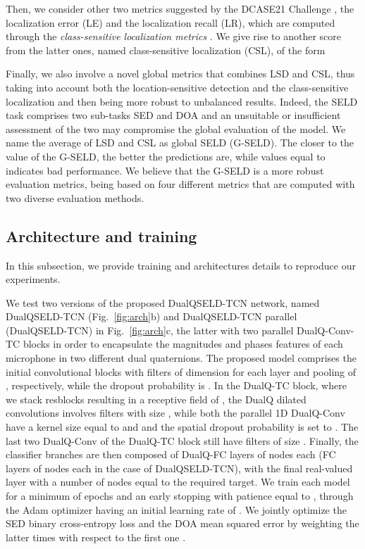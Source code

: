 \documentclass[3p, preprint, twocolumn]{elsarticle}
\begin{document}
Then, we consider other two metrics suggested by the DCASE21 Challenge \cite{Politis2021OverviewAE}, the localization error (LE) and the localization recall (LR), which are computed through the \textit{class-sensitive localization metrics} \cite{Mesaros2019Measurement}. We give rise to another score from the latter ones, named class-sensitive localization (CSL), of the form

Finally, we also involve a novel global metrics that combines LSD and CSL, thus taking into account both the location-sensitive detection and the class-sensitive localization and then being more robust to unbalanced results. Indeed, the SELD task comprises two sub-tasks SED and DOA and an unsuitable or insufficient assessment of the two may compromise the global evaluation of the model. We name the average of LSD and CSL as global SELD (G-SELD). The closer to  the value of the G-SELD, the better the predictions are, while values equal to  indicates bad performance. We believe that the G-SELD is a more robust evaluation metrics, being based on four different metrics that are computed with two diverse evaluation methods.

\subsection{Architecture and training}
In this subsection, we provide training and architectures details to reproduce our experiments.

We test two versions of the proposed DualQSELD-TCN network, named DualQSELD-TCN (Fig.~\ref{fig:arch}b) and DualQSELD-TCN parallel (DualQSELD-TCN) in Fig.~\ref{fig:arch}c, the latter with two parallel DualQ-Conv-TC blocks in order to encapsulate the magnitudes and phases features of each microphone in two different dual quaternions.
The proposed model comprises the initial convolutional blocks with  filters of dimension  for each layer and pooling of , respectively, while the dropout probability is . In the DualQ-TC block, where we stack  resblocks resulting in a receptive field of , the DualQ dilated convolutions involves  filters with size , while both the parallel 1D DualQ-Conv have a kernel size equal to  and  and the spatial dropout probability is set to . The last two DualQ-Conv of the DualQ-TC block still have  filters of size . Finally, the classifier branches are then composed of DualQ-FC layers of  nodes each (FC layers of  nodes each in the case of DualQSELD-TCN), with the final real-valued layer with a number of nodes equal to the required target. We train each model for a minimum of  epochs and an early stopping with patience equal to , through the Adam optimizer having an initial learning rate of . We jointly optimize the SED binary cross-entropy loss and the DOA mean squared error by weighting the latter  times with respect to the first one \cite{guizzo2021l3das21}.
\end{document}
